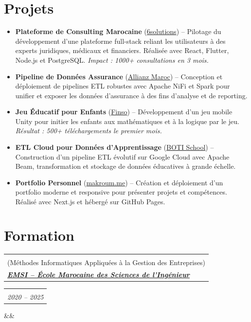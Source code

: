 \documentclass[12pt,a4paper,sans]{moderncv}
\makeatletter
\newcommand*{\customcventry}[7][.10em]{%
    \begin{tabular}{@{}l}
        {\bfseries #4} \\
        {\itshape #3}
    \end{tabular}
    \hfill
    \begin{tabular}{l@{}}
        {\bfseries #5} \\
        {\itshape #2}
    \end{tabular}
    \ifx&#7&%
    \else{\\
    \begin{minipage}{\maincolumnwidth}%
        \footnotesize#7%
    \end{minipage}}\fi%
    \par\addvspace{#1}
    }
\makeatother
\begin{document}
    \section{Projets}
    \vspace{0.5em}
    \begin{itemize}[leftmargin=0.7cm, itemsep=2pt, topsep=2pt]
        \item \textbf{Plateforme de Consulting Marocaine} (\href{https://6solutions.ma/}{6solutions}) – Pilotage du développement d'une plateforme full-stack reliant les utilisateurs à des experts juridiques, médicaux et financiers. Réalisée avec React, Flutter, Node.js et PostgreSQL. \textit{Impact : 1000+ consultations en 3 mois.}
        \item \textbf{Pipeline de Données Assurance} (\href{https://www.allianz.ma/}{Allianz Maroc}) – Conception et déploiement de pipelines ETL robustes avec Apache NiFi et Spark pour unifier et exposer les données d'assurance à des fins d'analyse et de reporting.
        \item \textbf{Jeu Éducatif pour Enfants} (\href{https://finso.ma/}{Finso}) – Développement d'un jeu mobile Unity pour initier les enfants aux mathématiques et à la logique par le jeu. \textit{Résultat : 500+ téléchargements le premier mois.}
        \item \textbf{ETL Cloud pour Données d'Apprentissage} (\href{https://www.botischool.com/}{BOTI School}) – Construction d'un pipeline ETL évolutif sur Google Cloud avec Apache Beam, transformation et stockage de données éducatives à grande échelle.
        \item \textbf{Portfolio Personnel} (\href{https://ahmedmakroum.github.io/AhmedMakroumPortfolio/}{makroum.me}) – Création et déploiement d'un portfolio moderne et responsive pour présenter projets et compétences. Réalisé avec Next.js et hébergé sur GitHub Pages.
    \end{itemize}

    \vspace{-3mm}
    \section{Formation}

\customcventry
    {2020 -- 2025}
    {\href{https://emsi.ma}{\textbf{EMSI – École Marocaine des Sciences de l’Ingénieur}}}
    {Master MIAGE en Ingénierie Logicielle et Réseaux\\(Méthodes Informatiques Appliquées à la Gestion des Entreprises)}
    {}{}{}
\end{document}
